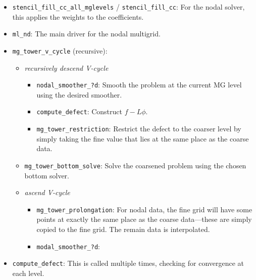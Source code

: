 \begin{itemize}

\item {\tt stencil\_fill\_cc\_all\_mglevels} / {\tt stencil\_fill\_cc}:
  For the nodal solver, this applies the weights to the 
  coefficients. 

\item {\tt ml\_nd}: The main driver for the nodal multigrid.

\item {\tt mg\_tower\_v\_cycle} (recursive):
\begin{itemize}

  \item {\em recursively descend V-cycle}
  \begin{itemize} 
  \item {} {\tt nodal\_smoother\_?d}: Smooth the 
    problem at the current MG level using the desired smoother.

  \item {\tt compute\_defect}: Construct $f - L\phi$.

  \item{} {\tt mg\_tower\_restriction}:  Restrict
    the defect to the coarser level by simply taking the fine value that
    lies at the same place as the coarse data.
  \end{itemize}

  \item {\tt mg\_tower\_bottom\_solve}:  Solve the coarsened problem
    using the chosen bottom solver.

  \item {\em ascend V-cycle}
  \begin{itemize}
  \item{} {\tt mg\_tower\_prolongation}: For nodal data, the fine grid
     will have some points at exactly the same place as the coarse data---these are
     simply copied to the fine grid.  The remain data is interpolated.

  \item{} {\tt modal\_smoother\_?d}:
  \end{itemize}

\end{itemize}
\item {\tt compute\_defect}: This is called multiple times, checking for
   convergence at each level.


\end{itemize}




